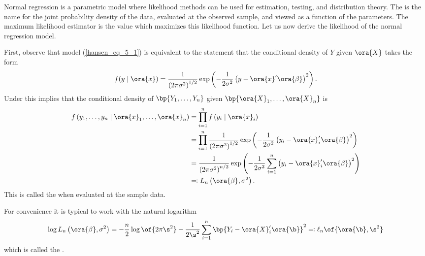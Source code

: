 Normal regression is a parametric model where likelihood methods can be used for estimation, testing, and distribution theory. The  is the name for the joint probability density of the data, evaluated at the observed sample, and viewed as a function of the parameters. The maximum likelihood estimator is the value which maximizes this likelihood function. Let us now derive the likelihood of the normal regression model.

First, observe that model (\ref{hansen_eq_5_1}) is equivalent to the statement that the conditional density of $Y$ given $\ora{X}$ takes the form
\begin{equation}
    \notag
    f(y \mid \ora{x})=\frac{1}{\left(2 \pi \sigma^2\right)^{1 / 2}} \exp \left(-\frac{1}{2 \sigma^2}\left(y-\ora{x}^{\prime} \ora{\beta}\right)^2\right).
\end{equation}
Under  this implies that the conditional density of $\bp{Y_1, \ldots, Y_n}$ given $\bp{\ora{X}_1, \ldots, \ora{X}_n}$ is 
\begin{equation}
	\notag
	\begin{aligned}
		\begin{aligned}
            f\left(y_1, \ldots, y_n \mid \ora{x}_1, \ldots, \ora{x}_n\right) & =\prod_{i=1}^n f\left(y_i \mid \ora{x}_i\right) \\
            & =\prod_{i=1}^n \frac{1}{\left(2 \pi \sigma^2\right)^{1 / 2}} \exp \left(-\frac{1}{2 \sigma^2}\left(y_i-\ora{x}_i^{\prime} \ora{\beta}\right)^2\right) \\
            & =\frac{1}{\left(2 \pi \sigma^2\right)^{n / 2}} \exp \left(-\frac{1}{2 \sigma^2} \sum_{i=1}^n\left(y_i-\ora{x}_i^{\prime} \ora{\beta}\right)^2\right) \\
            & \eqqcolon L_n\left(\ora{\beta}, \sigma^2\right) .
            \end{aligned}
	\end{aligned}
\end{equation}
This is called the  when evaluated at the sample data.

For convenience it is typical to work with the natural logarithm 
\begin{equation}
    \label{hansen_eq_5_2}
    \log L_n\left(\ora{\beta}, \sigma^2\right) = -\frac{n}{2}\log\of{2 \pi \s^2} - \frac{1}{2 \s^2} \sum_{i=1}^{n} \bp{Y_i - \ora{X}_i^\prime \ora{\b}}^2 \eqqcolon \ell_n\of{\ora{\b}, \s^2}
\end{equation}
which is called the .

